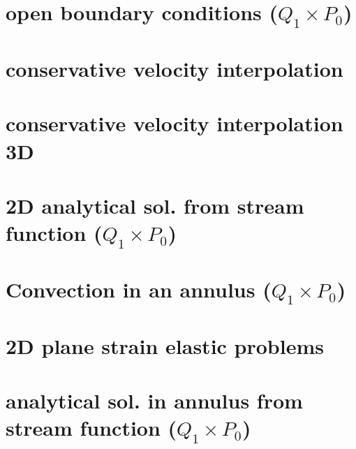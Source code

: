\documentclass[a4paper,11pt]{report}
\begin{document}
\chapter{open boundary conditions ($Q_1\times P_0$)\label{f29}} %

\chapter{conservative velocity interpolation \label{f30}} %

\chapter{conservative velocity interpolation 3D \label{f31}} %

\chapter{2D analytical sol. from stream function ($Q_1\times P_0$)\label{f32}} %

\chapter{Convection in an annulus  ($Q_1\times P_0$)  \label{f33}} %

\chapter{2D plane strain elastic problems\label{f34}} %

\chapter{analytical sol. in annulus from stream function ($Q_1\times P_0$) \label{f35}} %
\end{document}
